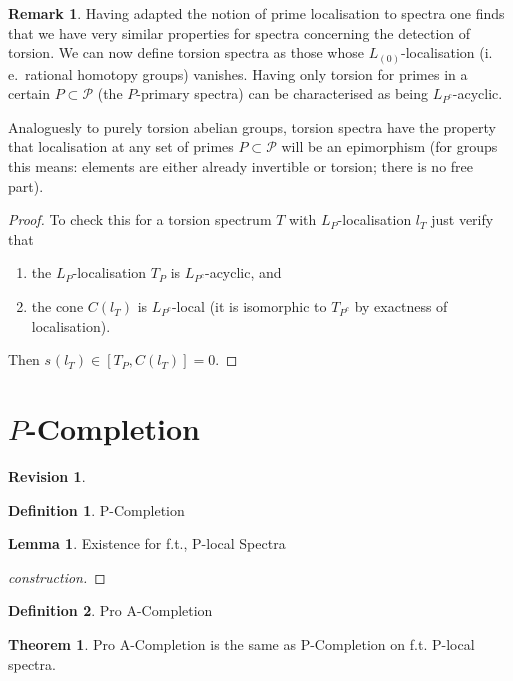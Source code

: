 \documentclass[english]{scrartcl}
\theoremstyle{definition}
\newtheorem*{Def}{Definition}
\newtheorem*{Rev}{Revision}
\newtheorem*{Thm}{Theorem}
\newtheorem*{Lem}{Lemma}
\newtheorem*{Rem}{Remark}
\theoremstyle{remark}
\newcommand*{\idest}{i.\,e.\ }
\newcommand*{\Cone}[1]{C(#1)}
\newcommand*{\conem}[2][]{s^{#1}(#2)}  %
\newcommand*{\Ps}{P}  %
\newcommand*{\PS}{\mathcal{P}} %
\newcommand*{\LP}[1][\Ps]{L_{#1}}  %
\begin{document}
\begin{Rem}
Having adapted the notion of prime localisation to spectra one finds
that we have very similar properties for spectra concerning the
detection of torsion. We can now define torsion spectra as those whose
$\LP[(0)]$-localisation (\idest rational homotopy groups) vanishes.
Having only torsion for primes in a certain $\Ps\subset\PS$ (the
$\Ps$-primary spectra) can be characterised as being
$\LP[\Ps^c]$-acyclic.

Analoguesly to purely torsion abelian groups, torsion spectra have the
property that localisation at any set of primes $\Ps\subset\PS$ will
be an epimorphism (for groups this means: elements are either already
invertible or torsion; there is no free part).
\begin{proof}
  To check this for a torsion spectrum $T$ with $\LP$-localisation
  $l_T$ just verify that
  \begin{enumerate}[nosep]
  \item the $\LP$-localisation $T_{\Ps}$ is
    $\LP[\Ps^c]$-acyclic, and
  \item the cone $\Cone {l_T}$ is $\LP[\Ps^c]$-local
    (it is isomorphic to $T_{\Ps^c}$ by exactness of
    localisation).
  \end{enumerate}
  Then $\conem {l_T} \in [T_{\Ps}, \Cone {l_T}]=0$.
\end{proof}
\end{Rem}

\section{$\Ps$-Completion}

\begin{Rev}
  
\end{Rev}
\begin{Def}
  P-Completion
\end{Def}
\begin{Lem}
  Existence for f.t., P-local Spectra
  \begin{proof}[construction]
  \end{proof}
\end{Lem}

\begin{Def}
  Pro A-Completion
\end{Def}
\begin{Thm}
  Pro A-Completion is the same as P-Completion on f.t. P-local
  spectra.
\end{Thm}

\nocite{*} \printbibliography
\end{document}
